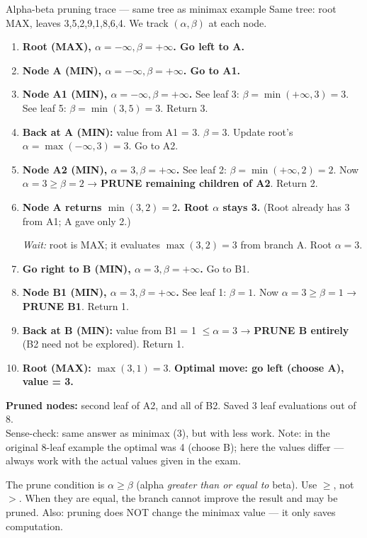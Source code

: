 \documentclass[a4paper,11pt]{article}
\begin{document}
\begin{worked}{Alpha-beta pruning trace — same tree as minimax example}
Same tree: root MAX, leaves 3,5,2,9,1,8,6,4. We track $(\alpha, \beta)$ at each node.

\begin{enumerate}[label=\textbf{Step \arabic*.}]
  \item \textbf{Root (MAX), $\alpha=-\infty, \beta=+\infty$. Go left to A.}
  \item \textbf{Node A (MIN), $\alpha=-\infty, \beta=+\infty$. Go to A1.}
  \item \textbf{Node A1 (MIN), $\alpha=-\infty, \beta=+\infty$.} See leaf 3: $\beta = \min(+\infty, 3) = 3$. See leaf 5: $\beta = \min(3,5) = 3$. Return 3.
  \item \textbf{Back at A (MIN):} value from A1 = 3. $\beta = 3$. Update root's $\alpha = \max(-\infty, 3) = 3$. Go to A2.
  \item \textbf{Node A2 (MIN), $\alpha=3, \beta=+\infty$.} See leaf 2: $\beta = \min(+\infty, 2) = 2$. Now $\alpha = 3 \geq \beta = 2$ → \textbf{PRUNE remaining children of A2}. Return 2.
  \item \textbf{Node A returns $\min(3, 2) = 2$. Root $\alpha$ stays 3.} (Root already has 3 from A1; A gave only 2.)

  \emph{Wait:} root is MAX; it evaluates $\max(3, 2) = 3$ from branch A. Root $\alpha = 3$.

  \item \textbf{Go right to B (MIN), $\alpha=3, \beta=+\infty$.} Go to B1.
  \item \textbf{Node B1 (MIN), $\alpha=3, \beta=+\infty$.} See leaf 1: $\beta = 1$. Now $\alpha=3 \geq \beta=1$ → \textbf{PRUNE B1}. Return 1.
  \item \textbf{Back at B (MIN):} value from B1 = 1 $\leq \alpha = 3$ → \textbf{PRUNE B entirely} (B2 need not be explored). Return 1.
  \item \textbf{Root (MAX):} $\max(3, 1) = 3$. \textbf{Optimal move: go left (choose A), value = 3.}
\end{enumerate}
\textbf{Pruned nodes:} second leaf of A2, and all of B2. Saved 3 leaf evaluations out of 8. \\
Sense-check: same answer as minimax (3), but with less work. Note: in the original 8-leaf example the optimal was 4 (choose B); here the values differ — always work with the actual values given in the exam.
\end{worked}

\begin{watchout}
The prune condition is $\alpha \geq \beta$ (alpha \emph{greater than or equal to} beta). Use $\geq$, not $>$. When they are equal, the branch cannot improve the result and may be pruned. Also: pruning does NOT change the minimax value — it only saves computation.
\end{watchout}
\end{document}

